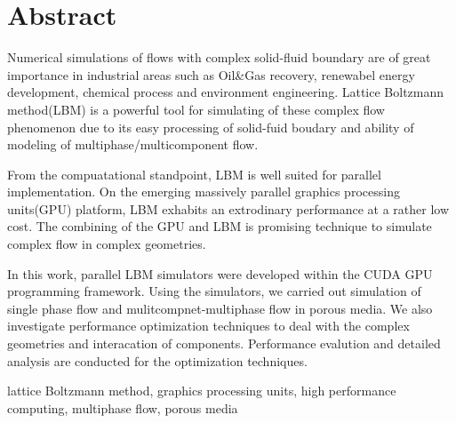 %
%

%
%
\renewcommand{\baselinestretch}{1.5}
\fontsize{12pt}{13pt}\selectfont

\chapter[ABSTRACT]{\textsf{\textbf{Abstract}}}
\noindent 
Numerical simulations of flows with complex solid-fluid boundary are
of great importance in industrial areas such as
Oil\&Gas recovery, renewabel energy development, chemical process and environment 
engineering. Lattice Boltzmann method(LBM) is a powerful tool
for simulating of these complex flow phenomenon due to its easy processing of 
solid-fuid boudary and ability of modeling of multiphase/multicomponent flow.

From the compuatational standpoint, LBM is well suited for parallel implementation.
On the  emerging massively parallel graphics processing units(GPU) platform, LBM exhabits
an extrodinary  performance at a rather low cost.  
The combining of the GPU and LBM is promising technique to simulate complex flow in complex
geometries.

In this work, parallel LBM simulators were developed within the CUDA GPU programming framework.
Using the simulators, we carried out simulation of single phase flow and mulitcompnet-multiphase flow in porous media.
We also investigate performance optimization techniques to deal with the 
complex geometries and interacation of components. 
Performance evalution and detailed analysis are conducted for the optimization techniques.

\vspace{1em}
 \quad lattice Boltzmann method, graphics processing units,
high performance computing, multiphase flow, porous media
